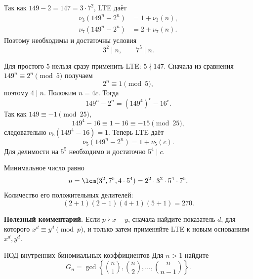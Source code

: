 \begin{solutionbox}
Так как $149-2=147=3\cdot7^2$, LTE даёт
\begin{align*}
  \nu_3(149^n-2^n)&=1+\nu_3(n),\\
  \nu_7(149^n-2^n)&=2+\nu_7(n).
\end{align*}
Поэтому необходимы и достаточны условия
\[
  3^2\mid n,
  \qquad7^5\mid n.
\]

Для простого $5$ нельзя сразу применить LTE: $5\nmid147$. Сначала
из сравнения $149^n\equiv2^n\pmod5$ получаем
\[
  2^n\equiv1\pmod5,
\]
поэтому $4\mid n$. Положим $n=4c$. Тогда
\[
  149^n-2^n=(149^4)^c-16^c.
\]
Так как $149\equiv-1\pmod{25}$,
\[
  149^4-16\equiv1-16\equiv-15\pmod{25},
\]
следовательно $\nu_5(149^4-16)=1$. Теперь LTE даёт
\[
  \nu_5(149^n-2^n)=1+\nu_5(c).
\]
Для делимости на $5^5$ необходимо и достаточно $5^4\mid c$.

Минимальное число равно
\[
  n=\lcm(3^2,7^5,4\cdot5^4)
   =2^2\cdot3^2\cdot5^4\cdot7^5.
\]
Количество его положительных делителей:
\[
  (2+1)(2+1)(4+1)(5+1)=\boxed{270}.
\]

\textbf{Полезный комментарий.}
Если $p\nmid x-y$, сначала найдите показатель $d$, для которого
$x^d\equiv y^d\pmod p$, и только затем применяйте LTE к новым
основаниям $x^d,y^d$.
\end{solutionbox}

\begin{problembox}{НОД внутренних биномиальных коэффициентов}
Для $n>1$ найдите
\[
  G_n=\gcd\left\{\binom n1,\binom n2,\ldots,\binom n{n-1}\right\}.
\]
\end{problembox}

